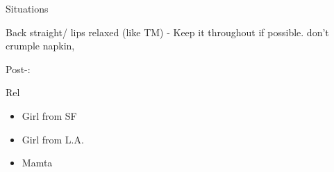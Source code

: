 \documentclass[serif, mathserif, final]{beamer}
\begin{document}
\begin{frame}
\begin{columns}
\begin{column}{0.20\linewidth}
\begin{block}{Situations}
\begin{itemize}
          Back straight/ lips relaxed (like
          TM) -  Keep it throughout if possible. 
          don't crumple napkin, 

          Post-:  

        \end{itemize} 

      \end{block}
      
\begin{block}{Rel}
  \begin{itemize} 
    \small \item \small Girl from SF 
    \small \item \small Girl from L.A. 
    \small \item \small Mamta 

  \end{itemize} 
\end{block} 
\end{column}%

\end{columns}

\end{frame}
\end{document}
